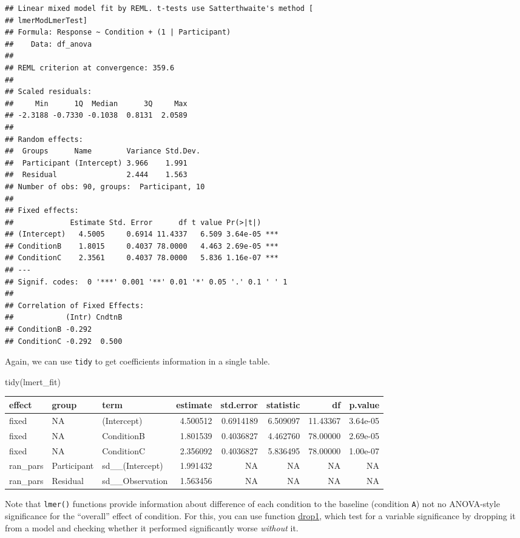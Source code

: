 \documentclass[
]{book}
\newenvironment{Shaded}{\begin{snugshade}}{\end{snugshade}}
\newcommand{\FunctionTok}[1]{\textcolor[rgb]{0.00,0.00,0.00}{#1}}
\newcommand{\NormalTok}[1]{#1}
\begin{document}
\begin{verbatim}
## Linear mixed model fit by REML. t-tests use Satterthwaite's method [
## lmerModLmerTest]
## Formula: Response ~ Condition + (1 | Participant)
##    Data: df_anova
## 
## REML criterion at convergence: 359.6
## 
## Scaled residuals: 
##     Min      1Q  Median      3Q     Max 
## -2.3188 -0.7330 -0.1038  0.8131  2.0589 
## 
## Random effects:
##  Groups      Name        Variance Std.Dev.
##  Participant (Intercept) 3.966    1.991   
##  Residual                2.444    1.563   
## Number of obs: 90, groups:  Participant, 10
## 
## Fixed effects:
##             Estimate Std. Error      df t value Pr(>|t|)    
## (Intercept)   4.5005     0.6914 11.4337   6.509 3.64e-05 ***
## ConditionB    1.8015     0.4037 78.0000   4.463 2.69e-05 ***
## ConditionC    2.3561     0.4037 78.0000   5.836 1.16e-07 ***
## ---
## Signif. codes:  0 '***' 0.001 '**' 0.01 '*' 0.05 '.' 0.1 ' ' 1
## 
## Correlation of Fixed Effects:
##            (Intr) CndtnB
## ConditionB -0.292       
## ConditionC -0.292  0.500
\end{verbatim}

Again, we can use \texttt{tidy} to get coefficients information in a single table.

\begin{Shaded}
\begin{Highlighting}[]
\FunctionTok{tidy}\NormalTok{(lmert\_fit)}
\end{Highlighting}
\end{Shaded}

\begin{tabular}{l|l|l|r|r|r|r|r}
\hline
effect & group & term & estimate & std.error & statistic & df & p.value\\
\hline
fixed & NA & (Intercept) & 4.500512 & 0.6914189 & 6.509097 & 11.43367 & 3.64e-05\\
\hline
fixed & NA & ConditionB & 1.801539 & 0.4036827 & 4.462760 & 78.00000 & 2.69e-05\\
\hline
fixed & NA & ConditionC & 2.356092 & 0.4036827 & 5.836495 & 78.00000 & 1.00e-07\\
\hline
ran\_pars & Participant & sd\_\_(Intercept) & 1.991432 & NA & NA & NA & NA\\
\hline
ran\_pars & Residual & sd\_\_Observation & 1.563456 & NA & NA & NA & NA\\
\hline
\end{tabular}

Note that \texttt{lmer()} functions provide information about difference of each condition to the baseline (condition \texttt{A}) not no ANOVA-style significance for the ``overall'' effect of condition. For this, you can use function \href{https://stat.ethz.ch/R-manual/R-devel/library/stats/html/add1.html}{drop1}, which test for a variable significance by dropping it from a model and checking whether it performed significantly worse \emph{without} it.
\end{document}
